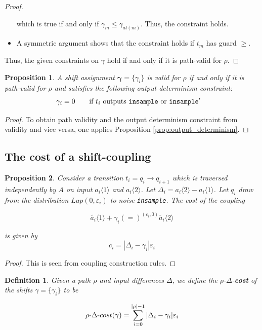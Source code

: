 \documentclass{article}
\newtheorem{proposition}{Proposition}[section]
\newtheorem{definition}{Definition}[section]
\renewcommand{\epsilon}{\varepsilon}
\newcommand{\insample}{\textup{\texttt{insample}}}
\newcommand{\1}{\langle 1 \rangle}
\newcommand{\2}{\langle 2 \rangle}
\begin{document}
\begin{proof}
\begin{itemize}
        which is true if and only if $\gamma_m \leq \gamma_{at(m)}$. Thus, the constraint holds.
        \item A symmetric argument shows that the constraint holds if $t_{m}$ has guard $\geq$.
    \end{itemize}

    Thus, the given constraints on $\gamma$ hold if and only if it is path-valid for $\rho$.
\end{proof}

\begin{proposition}
    A shift assignment $\boldsymbol{\gamma} = \{\gamma_i\}$ is valid for $\rho$ if and only if it is path-valid for $\rho$ and satisfies the following output determinism constraint:
    \begin{align*}
        \gamma_i = 0 \qquad &\text{if } t_i \text{ outputs } \insample \text{ or } \insample'
    \end{align*}
\end{proposition}

\begin{proof}
    To obtain path validity and the output determinism constraint from validity and vice versa, one applies Proposition \ref{prop:output_determinism}.
\end{proof}

\subsection{The cost of a shift-coupling}

\begin{proposition}
    Consider a transition $t_i = q_{i} \to q_{i + 1}$ which is traversed independently by $A$ on input $a_i \1$ and $a_i \2$. Let $\Delta_i = a_i \2 - a_i \1$. Let $q_i$ draw from the distribution $Lap(0, \epsilon_i)$ to noise \texttt{insample}. The cost of the coupling 

    \[\tilde{a_i} \1 + \gamma_i (=)^{(c_i, 0)} \tilde{a_i} \2\]

    is given by \[c_i = |\Delta_i - \gamma_i| \epsilon_i \]
\end{proposition} 

\begin{proof}
    This is seen from coupling construction rules.
\end{proof}

\begin{definition}
    Given a path $\rho$ and input differences $\Delta$, we define the $\rho$-$\Delta$-\textbf{cost} of the shifts $\gamma = \{\gamma_i\}$ to be

    \[\rho{\text -}\Delta{\text -}cost(\gamma) = \sum_{i = 0}^{|\rho| - 1} |\Delta_i - \gamma_i| \epsilon_i\]
\end{definition}
\end{document}
